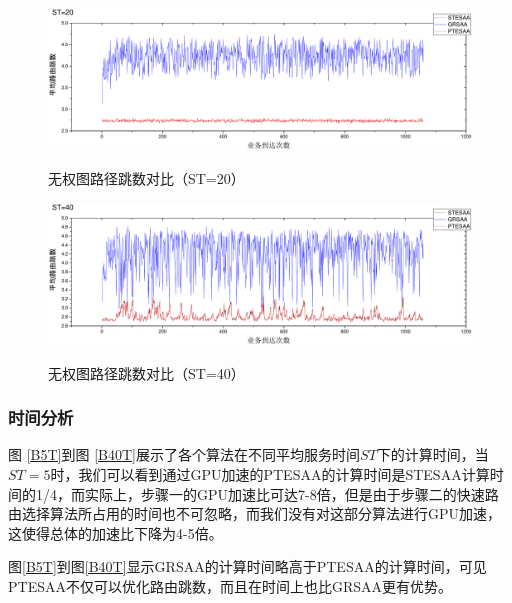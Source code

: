 \begin{figure}
\vspace{-2cm}
\setlength{\belowcaptionskip}{-1cm}
\begin{center}
{\includegraphics[width=1 \textwidth]{figures/B20H.pdf}}
\end{center}
\caption{{\footnotesize{无权图路径跳数对比（ST=20）}}}
\label{B20H}
\end{figure}
\begin{figure}
\vspace{-2cm}
\setlength{\belowcaptionskip}{-1cm}
\begin{center}
{\includegraphics[width=1 \textwidth]{figures/B40H.pdf}}
\end{center}
\caption{{\footnotesize{无权图路径跳数对比（ST=40）}}}
\label{B40H}
\end{figure}
\subsubsection{时间分析}

图 \ref{B5T}到图 \ref{B40T}展示了各个算法在不同平均服务时间$ST$下的计算时间，当$ST=5$时，我们可以看到通过GPU加速的PTESAA的计算时间是STESAA计算时间的1/4，而实际上，步骤一的GPU加速比可达7-8倍，但是由于步骤二的快速路由选择算法所占用的时间也不可忽略，而我们没有对这部分算法进行GPU加速，这使得总体的加速比下降为4-5倍。

图\ref{B5T}到图\ref{B40T}显示GRSAA的计算时间略高于PTESAA的计算时间，可见PTESAA不仅可以优化路由跳数，而且在时间上也比GRSAA更有优势。

